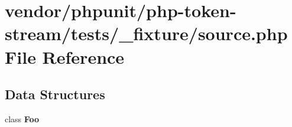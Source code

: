 \section{vendor/phpunit/php-\/token-\/stream/tests/\+\_\+fixture/source.php File Reference}
\label{source_8php}
\subsection*{Data Structures}
\begin{DoxyCompactItemize}
\item 
class {\bf Foo}
\end{DoxyCompactItemize}
